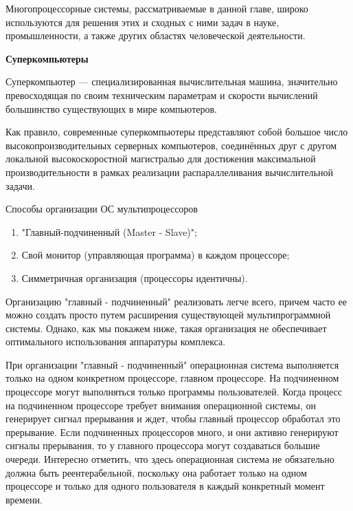 Многопроцессорные системы, рассматриваемые в данной главе, широко используются для решения этих и сходных с ними задач в науке, промышленности, а также других областях человеческой деятельности.

\begin{center}{\bfseries Суперкомпьютеры}
\end{center}

\begin{opr}
  Суперкомпьютер — специализированная вычислительная машина, значительно превосходящая по своим техническим параметрам и скорости вычислений большинство существующих в мире компьютеров.
\end{opr}

Как правило, современные суперкомпьютеры представляют собой большое число высокопроизводительных серверных компьютеров, соединённых друг с другом локальной высокоскоростной магистралью для достижения максимальной производительности в рамках реализации распараллеливания вычислительной задачи.

\begin{utv}
  Способы организации ОС мультипроцессоров
  \begin{enumerate}
    \item "Главный-подчиненный (Master - Slave)";
    \item Свой монитор (управляющая программа) в каждом процессоре;
    \item Симметричная организация (процессоры идентичны).
  \end{enumerate}
\end{utv}

Организацию "главный - подчиненный" реализовать легче всего, причем часто ее можно создать просто путем расширения существующей мультипрограммной системы. Однако, как мы покажем ниже, такая организация не обеспечивает оптимального использования аппаратуры комплекса.

При организации "главный - подчиненный" операционная система выполняется только на одном конкретном процессоре, главном процессоре. На подчиненном процессоре могут выполняться только программы пользователей. Когда процесс на подчиненном процессоре требует внимания операционной системы, он генерирует сигнал прерывания и ждет, чтобы главный процессор обработал это прерывание. Если подчиненных процессоров много, и они активно генерируют сигналы прерывания, то у главного процессора могут создаваться большие очереди. Интересно отметить, что здесь операционная система не обязательно должна быть реентерабельной, поскольку она работает только на одном процессоре и только для одного пользователя в каждый конкретный момент времени.


